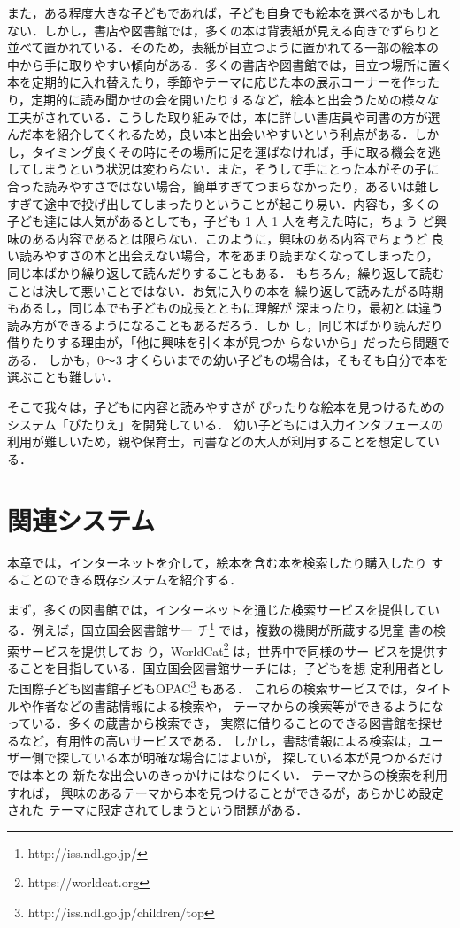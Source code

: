 \documentclass[japanese]{jnlp_1.4}
\begin{document}
また，ある程度大きな子どもであれば，子ども自身でも絵本を選べるかもしれ
ない．しかし，書店や図書館では，多くの本は背表紙が見える向きでずらりと
並べて置かれている．そのため，表紙が目立つように置かれてる一部の絵本の
中から手に取りやすい傾向がある．多くの書店や図書館では，目立つ場所に置く
本を定期的に入れ替えたり，季節やテーマに応じた本の展示コーナーを作った
り，定期的に読み聞かせの会を開いたりするなど，絵本と出会うための様々な
工夫がされている．こうした取り組みでは，本に詳しい書店員や司書の方が選
んだ本を紹介してくれるため，良い本と出会いやすいという利点がある．しか
し，タイミング良くその時にその場所に足を運ばなければ，手に取る機会を逃
してしまうという状況は変わらない．また，そうして手にとった本がその子に
合った読みやすさではない場合，簡単すぎてつまらなかったり，あるいは難し
すぎて途中で投げ出してしまったりということが起こり易い．内容も，多くの
子ども達には人気があるとしても，子ども 1 人 1 人を考えた時に，ちょう
ど興味のある内容であるとは限らない．このように，興味のある内容でちょうど
良い読みやすさの本と出会えない場合，本をあまり読まなくなってしまったり，
同じ本ばかり繰り返して読んだりすることもある．
もちろん，繰り返して読むことは決して悪いことではない．お気に入りの本を
繰り返して読みたがる時期もあるし，同じ本でも子どもの成長とともに理解が
深まったり，最初とは違う読み方ができるようになることもあるだろう．しか
し，同じ本ばかり読んだり借りたりする理由が，「他に興味を引く本が見つか
らないから」だったら問題である．
しかも，0〜3 才くらいまでの幼い子どもの場合は，そもそも自分で本を選ぶことも難しい．

そこで我々は，子どもに内容と読みやすさが
ぴったりな絵本を見つけるためのシステム「ぴたりえ」を開発している．
幼い子どもには入力インタフェースの利用が難しいため，親や保育士，司書などの大人が利用することを想定している．


\section{関連システム}\label{sec:previous}

本章では，インターネットを介して，絵本を含む本を検索したり購入したり
することのできる既存システムを紹介する．


まず，多くの図書館では，インターネットを通じた検索サービスを提供してい
る．例えば，国立国会図書館サー
チ\footnote{http://iss.ndl.go.jp/} では，複数の機関が所蔵する児童
書の検索サービスを提供してお
り，WorldCat\footnote{https://worldcat.org} は，世界中で同様のサー
ビスを提供することを目指している．国立国会図書館サーチには，子どもを想
定利用者とした国際子ども図書館子どもOPAC\footnote{http://iss.ndl.go.jp/children/top} もある．
これらの検索サービスでは，タイトルや作者などの書誌情報による検索や，
テーマからの検索等ができるようになっている．多くの蔵書から検索でき，
実際に借りることのできる図書館を探せるなど，有用性の高いサービスである．
しかし，書誌情報による検索は，ユーザー側で探している本が明確な場合にはよいが，
探している本が見つかるだけでは本との
新たな出会いのきっかけにはなりにくい．
テーマからの検索を利用すれば，
興味のあるテーマから本を見つけることができるが，あらかじめ設定された
テーマに限定されてしまうという問題がある．
\end{document}
